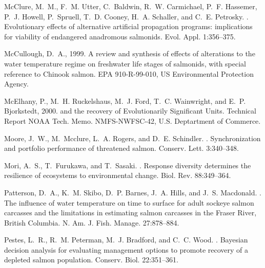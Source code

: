 \documentclass[12pt,english]{article}
\begin{document}
\begin{spacing}{1.3}
\begin{thebibliography}{64}
McClure, M.~M., F.~M. Utter, C.~Baldwin, R.~W. Carmichael, P.~F. Hassemer,
  P.~J. Howell, P.~Spruell, T.~D. Cooney, H.~A. Schaller, and C.~E. Petrosky.
.
\newblock Evolutionary effects of alternative artificial propagation programs:
  implications for viability of endangered anadromous salmonids.
\newblock Evol. Appl. 1:356--375.

McCullough, D.~A., 1999.
\newblock A review and synthesis of effects of alterations to the water
  temperature regime on freshwater life stages of salmonids, with special
  reference to {Chinook} salmon.
\newblock EPA 910-R-99-010, US Environmental Protection Agency.

McElhany, P., M.~H. Ruckelshaus, M.~J. Ford, T.~C. Wainwright, and E.~P.
  Bjorkstedt, 2000.
 and the recovery of {Evolutionarily
  Significant Units}.
\newblock Technical Report NOAA Tech. Memo. NMFS-NWFSC-42, U.S. Deptartment of
  Commerce.

Moore, J.~W., M.~Mcclure, L.~A. Rogers, and D.~E. Schindler.
.
\newblock Synchronization and portfolio performance of threatened salmon.
\newblock Conserv. Lett. 3:340--348.

Mori, A.~S., T.~Furukawa, and T.~Sasaki.
.
\newblock Response diversity determines the resilience of ecosystems to
  environmental change.
\newblock Biol. Rev. 88:349--364.

Patterson, D.~A., K.~M. Skibo, D.~P. Barnes, J.~A. Hills, and J.~S. Macdonald.
.
\newblock The influence of water temperature on time to surface for adult
  sockeye salmon carcasses and the limitations in estimating salmon carcasses
  in the {Fraser River, British Columbia}.
\newblock N. Am. J. Fish. Manage. 27:878--884.

Pestes, L.~R., R.~M. Peterman, M.~J. Bradford, and C.~C. Wood.
.
\newblock Bayesian decision analysis for evaluating management options to
  promote recovery of a depleted salmon population.
\newblock Conserv. Biol. 22:351--361.


\end{thebibliography}
\end{spacing}
\end{document}
